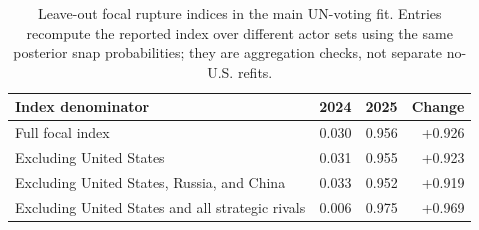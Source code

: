 \begin{table}[ht]
\centering
\caption{Leave-out focal rupture indices in the main UN-voting fit. Entries recompute the reported index over different actor sets using the same posterior snap probabilities; they are aggregation checks, not separate no-U.S. refits.}
\label{tab:leaveout-index}
\small
\begin{tabularx}{\textwidth}{@{}X r r r@{}}
\toprule
\textbf{Index denominator} & \textbf{2024} & \textbf{2025} & \textbf{Change} \\
\midrule
Full focal index & 0.030 & 0.956 & +0.926 \\
Excluding United States & 0.031 & 0.955 & +0.923 \\
Excluding United States, Russia, and China & 0.033 & 0.952 & +0.919 \\
Excluding United States and all strategic rivals & 0.006 & 0.975 & +0.969 \\
\bottomrule
\end{tabularx}
\end{table}

